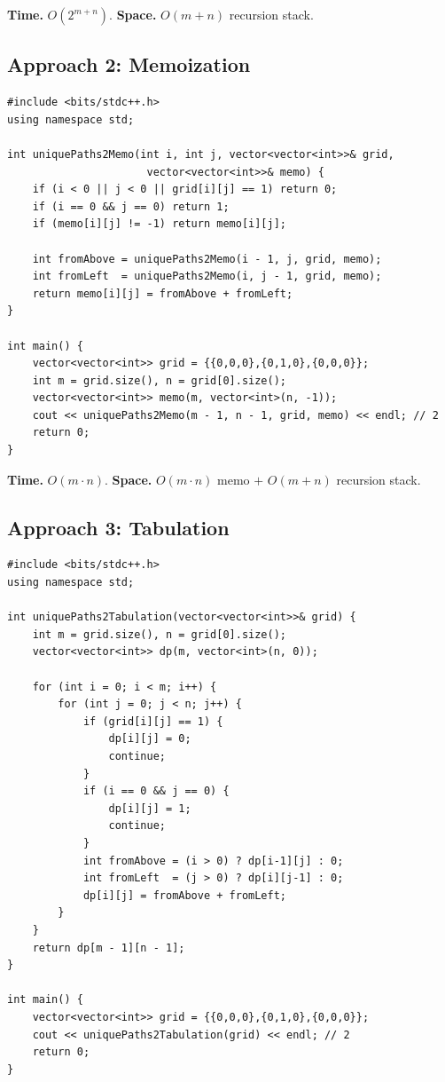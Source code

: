 \begin{complexitybox}
\textbf{Time.} $O(2^{m+n})$.
\textbf{Space.} $O(m+n)$ recursion stack.
\end{complexitybox}

\subsection*{Approach 2: Memoization}

\begin{lstlisting}
#include <bits/stdc++.h>
using namespace std;

int uniquePaths2Memo(int i, int j, vector<vector<int>>& grid,
                      vector<vector<int>>& memo) {
    if (i < 0 || j < 0 || grid[i][j] == 1) return 0;
    if (i == 0 && j == 0) return 1;
    if (memo[i][j] != -1) return memo[i][j];

    int fromAbove = uniquePaths2Memo(i - 1, j, grid, memo);
    int fromLeft  = uniquePaths2Memo(i, j - 1, grid, memo);
    return memo[i][j] = fromAbove + fromLeft;
}

int main() {
    vector<vector<int>> grid = {{0,0,0},{0,1,0},{0,0,0}};
    int m = grid.size(), n = grid[0].size();
    vector<vector<int>> memo(m, vector<int>(n, -1));
    cout << uniquePaths2Memo(m - 1, n - 1, grid, memo) << endl; // 2
    return 0;
}
\end{lstlisting}

\begin{complexitybox}
\textbf{Time.} $O(m \cdot n)$.
\textbf{Space.} $O(m \cdot n)$ memo $+$ $O(m+n)$ recursion stack.
\end{complexitybox}

\subsection*{Approach 3: Tabulation}

\begin{lstlisting}
#include <bits/stdc++.h>
using namespace std;

int uniquePaths2Tabulation(vector<vector<int>>& grid) {
    int m = grid.size(), n = grid[0].size();
    vector<vector<int>> dp(m, vector<int>(n, 0));

    for (int i = 0; i < m; i++) {
        for (int j = 0; j < n; j++) {
            if (grid[i][j] == 1) {
                dp[i][j] = 0;
                continue;
            }
            if (i == 0 && j == 0) {
                dp[i][j] = 1;
                continue;
            }
            int fromAbove = (i > 0) ? dp[i-1][j] : 0;
            int fromLeft  = (j > 0) ? dp[i][j-1] : 0;
            dp[i][j] = fromAbove + fromLeft;
        }
    }
    return dp[m - 1][n - 1];
}

int main() {
    vector<vector<int>> grid = {{0,0,0},{0,1,0},{0,0,0}};
    cout << uniquePaths2Tabulation(grid) << endl; // 2
    return 0;
}
\end{lstlisting}

